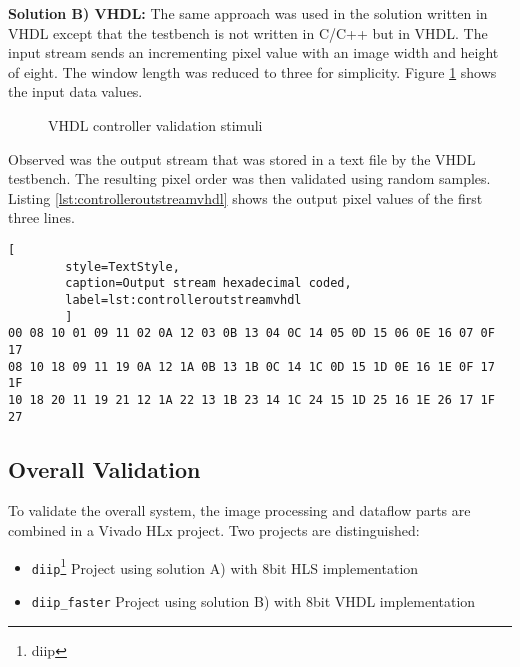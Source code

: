 \vspace{1ex}
\textbf{Solution B) VHDL:} The same approach was used in the solution written in
VHDL except that the testbench is not written in C/C++ but in VHDL. The input
stream sends an incrementing pixel value with an image width and height of
eight. The window length was reduced to three for simplicity. Figure 
\ref{fig:vhdlcontrollerstimuli} shows the input data values.

 \begin{figure}[h!]
    \centering
    \begin{adjustbox}{max width=\linewidth}
        
    \end{adjustbox}
    \caption{VHDL controller validation stimuli}
    \label{fig:vhdlcontrollerstimuli}
\end{figure}

Observed was the output stream that was stored in a text file by the VHDL
testbench. The resulting pixel order was then validated using random samples.
Listing \ref{lst:controlleroutstreamvhdl} shows the output pixel values of the
first three lines.

\begin{minipage}{\linewidth}
    \begin{lstlisting}[
        style=TextStyle, 
        caption=Output stream hexadecimal coded, 
        label=lst:controlleroutstreamvhdl
        ]
00 08 10 01 09 11 02 0A 12 03 0B 13 04 0C 14 05 0D 15 06 0E 16 07 0F 17 
08 10 18 09 11 19 0A 12 1A 0B 13 1B 0C 14 1C 0D 15 1D 0E 16 1E 0F 17 1F
10 18 20 11 19 21 12 1A 22 13 1B 23 14 1C 24 15 1D 25 16 1E 26 17 1F 27\end{lstlisting}
\end{minipage}

%
%
\subsection{Overall Validation}\label{ch:verification:overallvalidation}
To validate the overall system, the image processing and dataflow parts are
combined in a Vivado HLx project. Two projects are distinguished:
\begin{itemize}
    \item \texttt{diip}\footnote{\Gls{diip}} Project using solution A) with 8bit HLS
    implementation
    \item \texttt{diip\_faster} Project using solution B) with 8bit VHDL
    implementation
\end{itemize}

